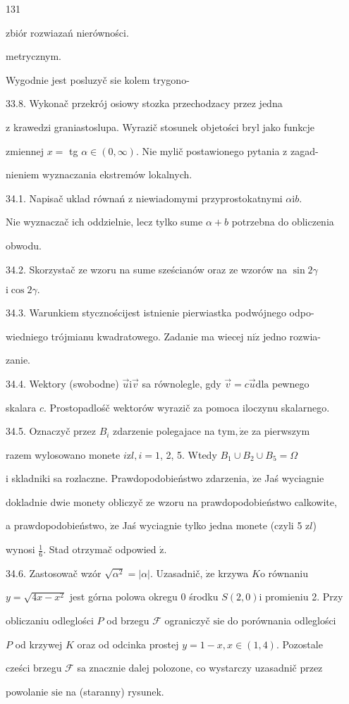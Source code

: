 \documentclass[a4paper,12pt]{article}
\begin{document}
131

zbiór rozwiazań nierówności.

metrycznym.

Wygodnie jest posluzyč sie kolem trygono-

33.8. Wykonač przekrój osiowy stozka przechodzacy przez jedna

$\mathrm{z}$ krawedzi graniastoslupa. Wyrazič stosunek objetości bryl jako funkcje

zmiennej $x =$ tg $\alpha \in (0,\infty)$. Nie mylič postawionego pytania $\mathrm{z}$ zagad-

nieniem wyznaczania ekstremów lokalnych.

34.1. Napisač uklad równań $\mathrm{z}$ niewiadomymi przyprostokatnymi $\alpha \mathrm{i}b.$

Nie wyznaczač ich oddzielnie, lecz tylko sume $\alpha+b$ potrzebna do obliczenia

obwodu.

34.2. Skorzystač ze wzoru na sume sześcianów oraz ze wzorów na $\sin 2\gamma$

$\mathrm{i}\cos 2\gamma.$

34.3. Warunkiem stycznościjest istnienie pierwiastka podwójnego odpo-

wiedniego trójmianu kwadratowego. Zadanie ma wiecej $\mathrm{n}\mathrm{i}\dot{\mathrm{z}}$ jedno rozwia-

zanie.

34.4. Wektory (swobodne) $\vec{u}\mathrm{i}\vec{v}$ sa równolegle, gdy $\vec{v}=c\vec{u}\mathrm{d}\mathrm{l}\mathrm{a}$ pewnego

skalara $c$. Prostopadlośč wektorów wyrazič za pomoca iloczynu skalarnego.

34.5. Oznaczyč przez $B_{i}$ zdarzenie polegajace na $\mathrm{t}\mathrm{y}\mathrm{m}, \dot{\mathrm{z}}\mathrm{e}$ za pierwszym

razem wylosowano monete $i \mathrm{z}l, i = 1$, 2, 5. Wtedy $B_{1}\cup B_{2}\cup B_{5} = \Omega$

$\mathrm{i}$ skladniki sa rozlaczne. Prawdopodobieństwo zdarzenia, $\dot{\mathrm{z}}\mathrm{e}$ Jaś wyciagnie

dokladnie dwie monety obliczyč ze wzoru na prawdopodobieństwo calkowite,

a prawdopodobieństwo, $\dot{\mathrm{z}}\mathrm{e}$ Jaś wyciagnie tylko jedna monete (czyli 5 $\mathrm{z}l$)

wynosi $\displaystyle \frac{1}{6}$. Stad otrzymač odpowied $\acute{\mathrm{z}}.$

34.6. Zastosowač wzór $\sqrt{\alpha^{2}}=|\alpha|$. Uzasadnič, $\dot{\mathrm{z}}\mathrm{e}$ krzywa $K\mathrm{o}$ równaniu

$y=\sqrt{4x-x^{2}}$ jest górna polowa okregu $0$ środku $S(2,0)\mathrm{i}$ promieniu 2. Przy

obliczaniu odleglości $P$ od brzegu $\mathcal{F}$ ograniczyč $\mathrm{s}\mathrm{i}\mathrm{e}$ do porównania odleglości

$P$ od krzywej $K$ oraz od odcinka prostej $y=1-x,  x\in (1,4)$. Pozostale

cześci brzegu $\mathcal{F}$ sa znacznie dalej polozone, co wystarczy uzasadnič przez

powolanie $\mathrm{s}\mathrm{i}\mathrm{e}$ na (staranny) rysunek.
\end{document}

